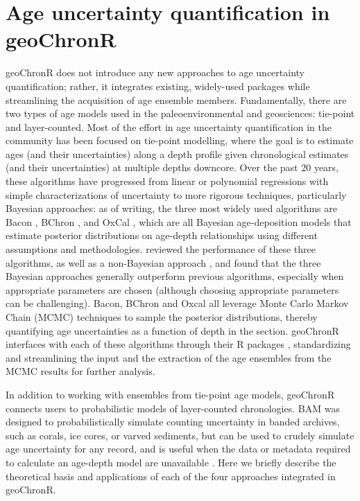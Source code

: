 \documentclass[gchron, manuscript]{copernicus}
\begin{document}
\hypertarget{sec:age-modeling}{%
\section{Age uncertainty quantification in geoChronR}\label{sec:age-modeling}}

geoChronR does not introduce any new approaches to age uncertainty quantification; rather, it integrates existing, widely-used packages while streamlining the acquisition of age ensemble members.
Fundamentally, there are two types of age models used in the paleoenvironmental and geosciences: tie-point and layer-counted.
Most of the effort in age uncertainty quantification in the community has been focused on tie-point modelling, where the goal is to estimate ages (and their uncertainties) along a depth profile given chronological estimates (and their uncertainties) at multiple depths downcore.
Over the past 20 years, these algorithms have progressed from linear or polynomial regressions with simple characterizations of uncertainty \citep{Heegaard2005, Blaauw2010CLAM} to more rigorous techniques, particularly Bayesian approaches: as of writing, the three most widely used algorithms are Bacon \citep{Blaauw2011BACON}, BChron \citep{parnell2008flexible}, and OxCal \citep{ramsey2008deposition}, which are all Bayesian age-deposition models that estimate posterior distributions on age-depth relationships using different assumptions and methodologies.
\citet{trachsel2017} reviewed the performance of these three algorithms, as well as a non-Bayesian approach \citep{Blaauw2010CLAM}, and found that the three Bayesian approaches generally outperform previous algorithms, especially when appropriate parameters are chosen (although choosing appropriate parameters can be challenging).
Bacon, BChron and Oxcal all leverage Monte Carlo Markov Chain (MCMC) techniques to sample the posterior distributions, thereby quantifying age uncertainties as a function of depth in the section.
geoChronR interfaces with each of these algorithms through their R packages \citep{parnell2008flexible, baconPackage, oxcAAR}, standardizing and streamlining the input and the extraction of the age ensembles from the MCMC results for further analysis.

In addition to working with ensembles from tie-point age models, geoChronR connects users to probabilistic models of layer-counted chronologies.
BAM \citep{BAM} was designed to probabilistically simulate counting uncertainty in banded archives, such as corals, ice cores, or varved sediments, but can be used to crudely simulate age uncertainty for any record, and is useful when the data or metadata required to calculate an age-depth model are unavailable \citep[e.g.][]{kaufman2020HoloceneGMST}.
Here we briefly describe the theoretical basis and applications of each of the four approaches integrated in geoChronR.
\end{document}
